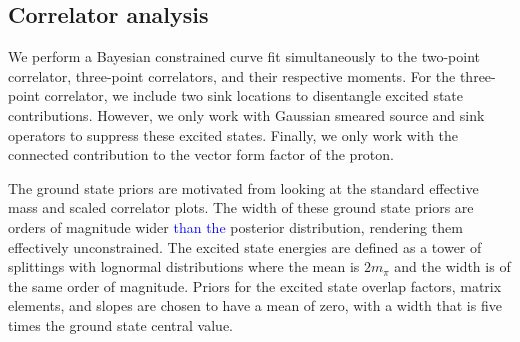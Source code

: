 \documentclass{PoS}
\newcommand{\kno}[1]{\textcolor{blue}{#1}}
\begin{document}
\subsection{Correlator analysis}
We perform a Bayesian constrained curve fit simultaneously to the two-point correlator, three-point correlators, and their respective moments. For the three-point correlator, we include two sink locations to disentangle excited state contributions. However, we only work with Gaussian smeared source and sink operators to suppress these excited states. Finally, we only work with the connected contribution to the vector form factor of the proton.

The ground state priors are motivated from looking at the standard effective mass and scaled correlator plots. The width of these ground state priors are orders of magnitude wider \kno{than the}  posterior distribution, rendering them effectively unconstrained. The excited state energies are defined as a tower of splittings with lognormal distributions where the mean is $2m_\pi$ and the width is of the same order of magnitude. Priors for the excited state overlap factors, matrix elements, and slopes are chosen to have a mean of zero, with a width that is five times the ground state central value.
\end{document}
